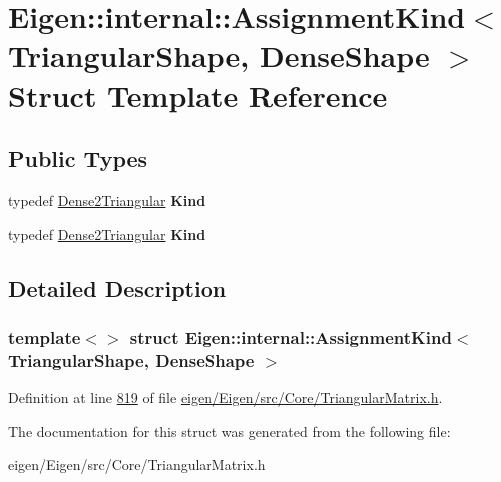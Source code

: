 \hypertarget{struct_eigen_1_1internal_1_1_assignment_kind_3_01_triangular_shape_00_01_dense_shape_01_4}{}\section{Eigen\+:\+:internal\+:\+:Assignment\+Kind$<$ Triangular\+Shape, Dense\+Shape $>$ Struct Template Reference}
\label{struct_eigen_1_1internal_1_1_assignment_kind_3_01_triangular_shape_00_01_dense_shape_01_4}
\subsection*{Public Types}
\begin{DoxyCompactItemize}
\item 
\mbox{\label{struct_eigen_1_1internal_1_1_assignment_kind_3_01_triangular_shape_00_01_dense_shape_01_4_afe17b0030002e7f1ae42f6200a80f220}} 
typedef \hyperlink{struct_eigen_1_1internal_1_1_dense2_triangular}{Dense2\+Triangular} {\bfseries Kind}
\item 
\mbox{\label{struct_eigen_1_1internal_1_1_assignment_kind_3_01_triangular_shape_00_01_dense_shape_01_4_afe17b0030002e7f1ae42f6200a80f220}} 
typedef \hyperlink{struct_eigen_1_1internal_1_1_dense2_triangular}{Dense2\+Triangular} {\bfseries Kind}
\end{DoxyCompactItemize}


\subsection{Detailed Description}
\subsubsection*{template$<$$>$\newline
struct Eigen\+::internal\+::\+Assignment\+Kind$<$ Triangular\+Shape, Dense\+Shape $>$}



Definition at line \hyperlink{eigen_2_eigen_2src_2_core_2_triangular_matrix_8h_source_l00819}{819} of file \hyperlink{eigen_2_eigen_2src_2_core_2_triangular_matrix_8h_source}{eigen/\+Eigen/src/\+Core/\+Triangular\+Matrix.\+h}.



The documentation for this struct was generated from the following file\+:\begin{DoxyCompactItemize}
\item 
eigen/\+Eigen/src/\+Core/\+Triangular\+Matrix.\+h\end{DoxyCompactItemize}
